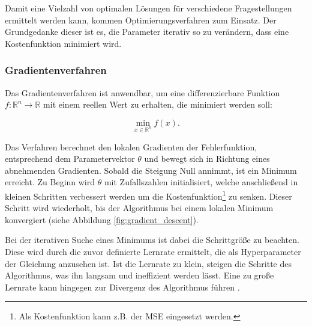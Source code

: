 Damit eine Vielzahl von optimalen Lösungen für verschiedene Fragestellungen ermittelt werden kann, kommen Optimierungsverfahren zum Einsatz. Der Grundgedanke dieser ist es, die Parameter iterativ so zu verändern, dass eine Kostenfunktion minimiert wird.

\subsubsection{Gradientenverfahren}
Das Gradientenverfahren ist anwendbar, um eine differenzierbare Funktion $f:\mathbb{R}^n \rightarrow\mathbb{R}$ mit einem reellen Wert zu erhalten, die minimiert werden soll:

\begin{equation}
	\min_{x\in\mathbb{R}^n} f(x).
\end{equation}

Das Verfahren berechnet den lokalen Gradienten der Fehlerfunktion, entsprechend dem Parametervektor $\theta$ und bewegt sich in Richtung eines abnehmenden Gradienten. Sobald die Steigung Null annimmt, ist ein Minimum erreicht. Zu Beginn wird $\theta$ mit Zufallszahlen initialisiert, welche anschließend in kleinen Schritten verbessert werden um die Kostenfunktion\footnote{Als Kostenfunktion kann z.B. der \ac{MSE} eingesetzt werden.} zu senken. Dieser Schritt wird wiederholt, bis der Algorithmus bei einem lokalen Minimum konvergiert \cite[112\psq]{Géron2017} (siehe Abbildung \ref{fig:gradient_descent}). 



Bei der iterativen Suche eines Minimums ist dabei die Schrittgröße zu beachten. Diese wird durch die zuvor definierte Lernrate ermittelt, die als \gls{Hyperparameter} der Gleichung anzusehen ist. Ist die Lernrate zu klein, steigen die Schritte des Algorithmus, was ihn langsam und ineffizient werden lässt. Eine zu große Lernrate kann hingegen zur Divergenz des Algorithmus führen \cite[114]{Géron2017}.

